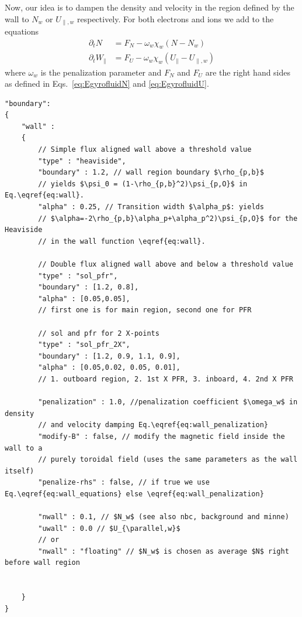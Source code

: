 Now, our idea is to dampen the density and velocity in the region defined by the
wall to $N_w$ or $U_{\parallel,w}$ respectively.
For both electrons and ions we add to the equations
\begin{subequations} \label{eq:wall_penalization}
\begin{align}
    \partial_t N &= F_N -\omega_w\chi_w (N-N_w)\\
    \partial_t W_\parallel &= F_U -\omega_w\chi_w (U_\parallel-U_{\parallel,w})
\end{align}
\end{subequations}
where $\omega_w$ is the penalization parameter and $F_N$ and $F_U$ are the
right hand sides as defined in Eqs.~\eqref{eq:EgyrofluidN} and \eqref{eq:EgyrofluidU}.
\begin{verbatim}
"boundary":
{
    "wall" :
    {
        // Simple flux aligned wall above a threshold value
        "type" : "heaviside",
        "boundary" : 1.2, // wall region boundary $\rho_{p,b}$
        // yields $\psi_0 = (1-\rho_{p,b}^2)\psi_{p,O}$ in Eq.\eqref{eq:wall}.
        "alpha" : 0.25, // Transition width $\alpha_p$: yields
        // $\alpha=-2\rho_{p,b}\alpha_p+\alpha_p^2)\psi_{p,O}$ for the Heaviside
        // in the wall function \eqref{eq:wall}.

        // Double flux aligned wall above and below a threshold value
        "type" : "sol_pfr",
        "boundary" : [1.2, 0.8],
        "alpha" : [0.05,0.05],
        // first one is for main region, second one for PFR

        // sol and pfr for 2 X-points
        "type" : "sol_pfr_2X",
        "boundary" : [1.2, 0.9, 1.1, 0.9],
        "alpha" : [0.05,0.02, 0.05, 0.01],
        // 1. outboard region, 2. 1st X PFR, 3. inboard, 4. 2nd X PFR

        "penalization" : 1.0, //penalization coefficient $\omega_w$ in density
        // and velocity damping Eq.\eqref{eq:wall_penalization}
        "modify-B" : false, // modify the magnetic field inside the wall to a
        // purely toroidal field (uses the same parameters as the wall itself)
        "penalize-rhs" : false, // if true we use Eq.\eqref{eq:wall_equations} else \eqref{eq:wall_penalization}

        "nwall" : 0.1, // $N_w$ (see also nbc, background and minne)
        "uwall" : 0.0 // $U_{\parallel,w}$
        // or
        "nwall" : "floating" // $N_w$ is chosen as average $N$ right before wall region


    }
}
\end{verbatim}
